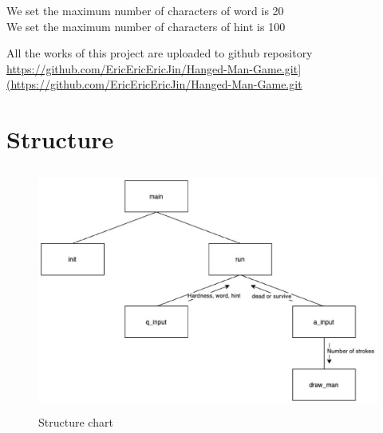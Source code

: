 \documentclass{article}
\begin{document}
        We set the maximum number of characters of word is 20 \\
        We set the maximum number of characters of hint is 100
        
        All the works of this project are uploaded to github repository \url{https://github.com/EricEricEricJin/Hanged-Man-Game.git](https://github.com/EricEricEricJin/Hanged-Man-Game.git}

    \newpage

    \section{Structure}

        \begin{figure}[htbp]

            \centering
            \includegraphics[height = 8cm]{structure.eps}
            \caption{Structure chart}
            \label{structure_chart}
        \end{figure}

    \newpage
\end{document}
